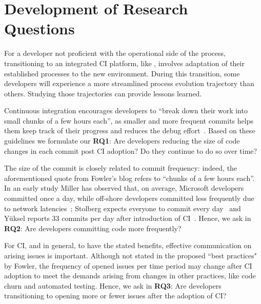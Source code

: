 
\section{Development of Research Questions}
\label{sec:background}

For a developer not proficient with the operational side of the process, 
transitioning to an integrated CI platform, like \Tvis, involves adaptation 
of their established processes to the new environment. 
During this transition, some developers will experience a more streamlined 
process evolution trajectory than others. 
Studying those trajectories can provide lessons learned.


%

Continuous integration encourages developers to ``break down their work 
into small chunks of a few hours each'', as smaller and more frequent commits 
helps them keep track of their progress and reduces the debug effort~\cite{Fowler,Duvall}. 
Based on these guidelines we formulate our \textbf{RQ1}: 
Are developers reducing the size of code changes in each commit post CI adoption? 
Do they continue to do so over time?

The size of the commit is closely related to commit frequency: indeed, the 
aforementioned quote from Fowler's blog refers to ``chunks of a few hours each''. 
In an early study Miller has observed that, on average, Microsoft developers 
committed once a day, while off-shore developers committed less frequently 
due to network latencies~\cite{Miller}; Stolberg expects everyone to commit every 
day~\cite{Stolberg} and Y\"{u}ksel reports 33 commits per day after introduction 
of CI~\cite{Yuksel}. 
Hence, we ask in \textbf{RQ2}: Are developers committing code more frequently?

For CI, and \DO in general, to have the stated benefits, effective communication on arising issues is important.
Although not stated in the proposed ``best practices" by Fowler, the frequency of opened issues per time period may change after CI adoption to meet the demands arising from changes in other practices, like code churn and automated testing.
Hence, we ask in \textbf{RQ3}: 
Are developers transitioning to opening more or fewer issues after the adoption of CI?

